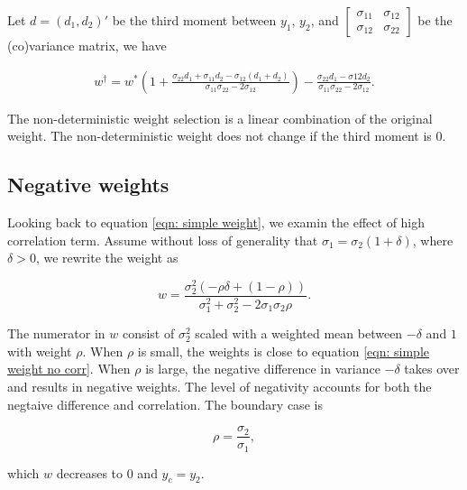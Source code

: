 \documentclass[]{article}
\begin{document}
Let \(d = (d_1, d_2)'\) be the third moment between \(y_1\), \(y_2\),
and
\(\begin{bmatrix} \sigma_{11} & \sigma_{12}\\ \sigma_{12} & \sigma_{22}\end{bmatrix}\)
be the (co)variance matrix, we have

\begin{equation}
\label{eqn: w w/ var w}
\begin{aligned}
w^\dagger = w^*(1+\frac{\sigma_{22} d_1 + \sigma_{11} d_2 -\sigma_{12} (d_1 + d_2)}{\sigma_{11}\sigma_{22} - 2\sigma_{12}}) - \frac{\sigma_{22} d_1 - \sigma{12}d_2}{\sigma_{11}\sigma_{22} - 2\sigma_{12}}.
\end{aligned}
\end{equation}

The non-deterministic weight selection is a linear combination of the
original weight. The non-deterministic weight does not change if the
third moment is \(0\).

\subsection{Negative weights}\label{negative-weights}

Looking back to equation \ref{eqn: simple weight}, we examin the effect
of high correlation term. Assume without loss of generality that
\(\sigma_1 =\sigma_2 (1 + \delta)\), where \(\delta>0\), we rewrite the
weight as

\begin{equation}
\label{eqn: w high corr}
w = \frac{\sigma_2^2(-\rho\delta+ (1-\rho))}{\sigma_1^2+\sigma_2^2 -2\sigma_1\sigma_2\rho}.
\end{equation}

The numerator in \(w\) consist of \(\sigma_2^2\) scaled with a weighted
mean between \(-\delta\) and \(1\) with weight \(\rho\). When \(\rho\)
is small, the weights is close to equation
\ref{eqn: simple weight no corr}. When \(\rho\) is large, the negative
difference in variance \(-\delta\) takes over and results in negative
weights. The level of negativity accounts for both the negtaive
difference and correlation. The boundary case is

\begin{equation}
\label{eqn: corr boundary}
\rho = \frac{\sigma_2}{\sigma_1},
\end{equation}

which \(w\) decreases to \(0\) and \(y_c = y_2\).
\end{document}
